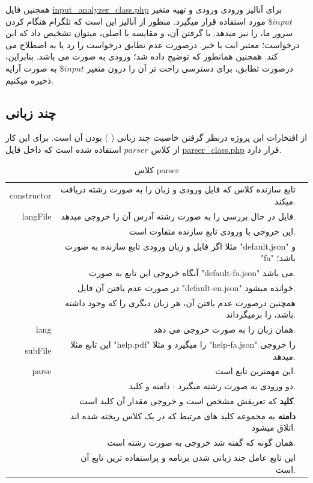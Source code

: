 \documentclass[oneside]{article}
\begin{document}
 همچنین  فایل 
\href{ftp://telegr28:telegram123456@telegramadminpro.ml/public_html/bot/input_analyzer_class}{input\_analyzer\_class.php}
برای آنالیز ورودی ورودی و تهیه متغیر $\$input$ مورد استفاده قرار میگیرد.
منظور از آنالیز این است که تلگرام هنگام  کردن سرور ما،  را نیز میدهد. با گرفتن آن، و مقایسه با  اصلی، میتوان تشخیص داد که این درخواست؛ معتبر ایت یا خیر. درصورت عدم تطابق درخواست را رد یا به اصطلاح  می کند.
همچنین همانطور که توضیح داده شد؛ ورودی به صورت  می باشد. بنابراین، درصورت تطابق، برای دسترسی راحت تر آن را درون متغیر $\$input$ به صورت آرایه ذخیره میکنیم.

\subsection{ چند زبانی }
از افتخارات این پروژه درنظر گرفتن خاصیت چند زبانی (
) بودن آن است.
برای این کار از کلاس $parser$ استفاده شده است که داخل فایل 
\href{ftp://telegr28:telegram123456@telegramadminpro.ml/public_html/bot/parser_class.php}{parser\_class.php}
قرار دارد.

\begin{table}
\caption{کلاس parser}
\label{tbl:parser}
\centering
\renewcommand{\arraystretch}{1.3}
\begin{tabular}{rrr}\toprule 
constructor & تابع سازنده کلاس که فایل ورودی و زبان را به صورت رشته دریافت میکند.
\\
langFile & فایل در حال بررسی را به صورت رشته آدرس آن را خروجی میدهد.
\\
 & این خروجی با ورودی تابع سازنده متفاوت است.
\\
& مثلا اگر فایل و زبان ورودی تابع سازنده به صورت "default.json" و "fa" باشد؛
\\ 
& آنگاه خروجی این تابع به صورت "default-fa.json" می باشد.
\\
& در صورت عدم یافتن آن فایل "default-en.json" خوانده میشود.
\\
& همچنین درصورت عدم یافتن آن، هر زبان دیگری را که وجود داشته باشد، را برمیگرداند. 
\\
lang & همان زبان را به صورت خروجی می دهد.
\\
subFile & این تابع مثلا "help.pdf" را میگیرد و مثلا "help-fa.json" را خروجی میدهد.
\\
parse & این مهمترین تابع است.
\\
& دو ورودی به صورت رشته میگیرد : دامنه و کلید.
\\
& \textbf{کلید} 
که تعریفش مشخص است و خروجی مقدار آن کلید است.
\\
&  \textbf{دامنه}
به مجموعه کلید های مرتبط که در یک کلاس ریخته شده اند اتلاق میشود.
\\
& همان گونه که گفته شد خروجی به صورت رشته است. 
\\ &
این تابع عامل چند زبانی شدن برنامه و پراستفاده ترین تابع آن است.
\\
\bottomrule
\end{tabular}
\end{table}
\end{document}
